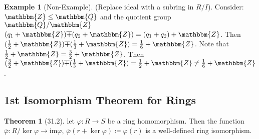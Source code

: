 \documentclass{article}
\newcommand{\Z}{\mathbbm{Z}}
\newcommand{\Q}{\mathbbm{Q}}
\newcommand{\coleq}{\coloneqq}
\newcommand{\func}[3]{#1: #2 \to #3}
\theoremstyle{definition}
\newtheorem*{thm}{Theorem}
\newtheorem*{ex}{Example}
\theoremstyle{remark}
\newcommand{\im}{\mathrm{im}}
\begin{document}
{{            \begin{ex}[Non-Example]
                (Replace ideal with a subring in $R/I$). Consider: $\Z\leq \Q$ and the quotient group $\Q/\Z$ $(q_1+\Z)\overline{+}(q_2+\Z)=(q_1+q_2)+\Z$. Then $(\frac{1}{2}+\Z)\overline{+}(\frac{1}{3}+\Z)=\frac{1}{6}+\Z$. Note that $\frac{1}{2}+\Z=\frac{3}{2}+\Z$. Then $(\frac{3}{2}+\Z)\overline{+}(\frac{1}{3}+\Z)=\frac{1}{2}+\Z \neq \frac{1}{6}+\Z$.
            \end{ex}
        }
        \subsection*{1st Isomorphism Theorem for Rings}{
            \begin{thm}[31.2]
                let $\func{\varphi}{R}{S}$ be a ring homomorphism. Then the function $\func{\overline{\varphi}}{R/\ker\varphi}{\im\varphi}$, $\overline{\varphi}(r+\ker\varphi)\coleq \varphi(r)$ is a well-defined ring isomorphism.
            \end{thm}
        
        }
    }
\end{document}
